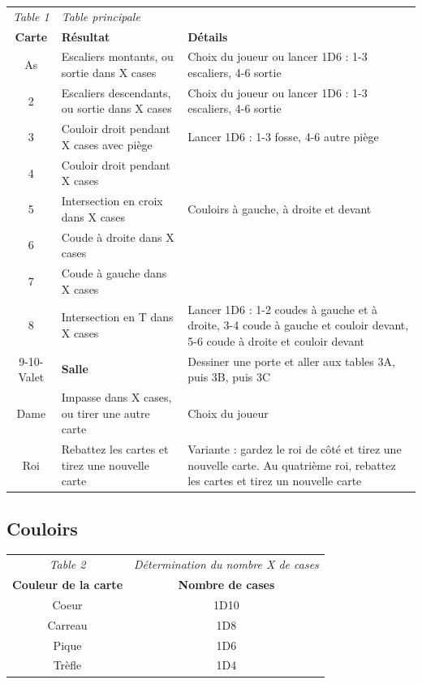 \documentclass[a4paper, 11pt, twoside]{article}
\begin{document}
\begin{longtable}{cp{6cm}p{8.5cm}}
\emph{Table 1} & \emph{Table principale} & \\
\textbf{Carte} & \textbf{Résultat} & \textbf{Détails}\\
As & Escaliers montants, ou sortie dans X cases & Choix du joueur ou lancer 1D6 : 1-3 escaliers, 4-6 sortie\\
2 & Escaliers descendants, ou sortie dans X cases & Choix du joueur ou lancer 1D6 : 1-3 escaliers, 4-6 sortie\\
3 & Couloir droit pendant X cases avec piège & Lancer 1D6 : 1-3 fosse, 4-6 autre piège\\
4 & Couloir droit pendant X cases & \\
5 & Intersection en croix dans X cases & Couloirs à gauche, à droite et devant\\
6 & Coude à droite dans X cases & \\
7 & Coude à gauche dans X cases & \\
8 & Intersection en T dans X cases & Lancer 1D6 : 1-2 coudes à gauche et à droite, 3-4 coude à gauche et couloir devant, 5-6 coude à droite et couloir devant\\
9-10-Valet & \textbf{Salle} & Dessiner une porte et aller aux tables 3A, puis 3B, puis 3C\\
Dame & Impasse dans X cases, ou tirer une autre carte & Choix du joueur\\
Roi & Rebattez les cartes et tirez une nouvelle carte & Variante : gardez le roi de côté et tirez une nouvelle carte. Au quatrième roi, rebattez les cartes et tirez un nouvelle carte\\
\end{longtable}


\subsection{Couloirs}
\label{sec:org8a56d54}

\begin{longtable}{cc}
\emph{Table 2} & \emph{Détermination du nombre X de cases}\\
\textbf{Couleur de la carte} & \textbf{Nombre de cases}\\
Coeur & 1D10\\
Carreau & 1D8\\
Pique & 1D6\\
Trèfle & 1D4\\
\end{longtable}
\end{document}

